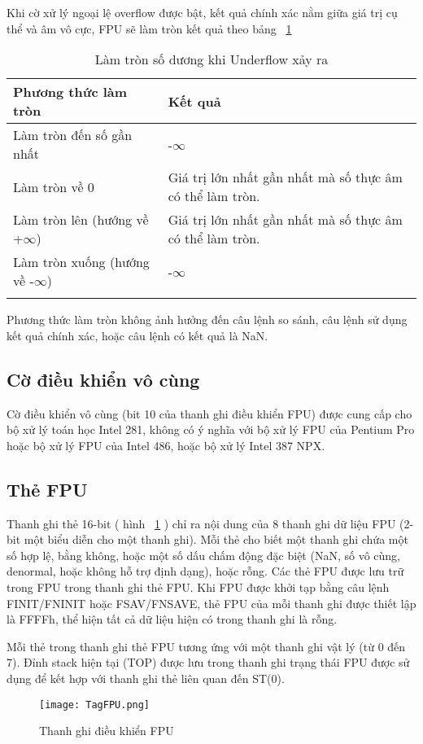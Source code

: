 	\newpage
	Khi cờ xử lý ngoại lệ overflow được bật, kết quả chính xác nằm giữa giá trị cụ thể  và âm vô cực, FPU sẽ làm tròn kết quả theo bảng ~\ref{tb:RCUnderflow}
		\begin{longtable} {|m{6cm}|m{6cm}|}
			\hline
				Phương thức làm tròn & Kết quả \\			
			\hline						
			\hline
				Làm tròn đến số gần nhất & -$\mathbf{\infty}$\\
			\hline
				Làm tròn về 0 & Giá trị lớn nhất gần nhất mà số thực âm có thể làm tròn.\\
			\hline
				Làm tròn lên (hướng về +$\mathbf{\infty}$) &  Giá trị lớn nhất gần nhất mà số thực âm có thể làm tròn.\\
			\hline
				Làm tròn xuống (hướng về -$\mathbf{\infty}$) & 	-$\mathbf{\infty}$\\
			\hline			
			\caption{Làm tròn số dương khi Underflow xảy ra}
			\label{tb:RCUnderflow}
		\end{longtable}		
		Phương thức làm tròn không ảnh hưởng đến câu lệnh so sánh, câu lệnh sử dụng kết quả chính xác, hoặc câu lệnh có kết quả là NaN.
		
		\subsection*{Cờ điều khiển vô cùng}
		Cờ điều khiển vô cùng (bit 10 của thanh ghi điều khiển FPU) được cung cấp cho bộ xử lý toán học Intel 281, không có ý nghĩa với bộ xử lý FPU của Pentium Pro hoặc bộ xử lý FPU của Intel 486, hoặc bộ xử lý Intel 387 NPX.
		
		\subsection*{Thẻ FPU}
		Thanh ghi thẻ 16-bit ( hình ~\ref{fig:TagFPU} ) chỉ ra nội dung của 8 thanh ghi dữ liệu FPU (2-bit một biểu diễn cho một thanh ghi). Mỗi thẻ cho biết một thanh ghi chứa một số hợp lệ, bằng không, hoặc một số dấu chấm động đặc biệt (NaN, số vô cùng, denormal, hoặc không hỗ trợ định dạng), hoặc rỗng. Các thẻ FPU được lưu trữ trong FPU trong thanh ghi thẻ FPU. Khi FPU được khởi tạp bằng câu lệnh FINIT/FNINIT hoặc FSAV/FNSAVE, thẻ FPU của mỗi thanh ghi được thiết lập là FFFFh, thể hiện tất cả dữ liệu hiện có trong thanh ghi là rỗng.		

	Mỗi thẻ trong thanh ghi thẻ FPU tương ứng với một thanh ghi vật lý (từ 0 đến 7). Đỉnh stack hiện tại (TOP) được lưu trong thanh ghi trạng thái FPU được sử dụng để kết hợp với thanh ghi thẻ liên quan đến ST(0). 	
	\begin{center}
			\begin{figure}[htp]
				\begin{center}
					\texttt{[image: TagFPU.png]}
				\end{center}
				\caption{Thanh ghi điều khiển FPU}				
				\label{fig:TagFPU}				
			\end{figure}
		\end{center}		
	
